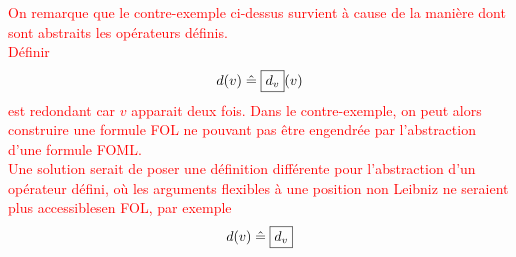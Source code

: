 \documentclass[12pt]{article}
\newcommand{\defeq}{\ensuremath{\; \hat{=} \;}}
\newcommand{\raph}[1]{\textcolor{red}{#1}}
\begin{document}
\vspace{1cm}

\raph{%
  On remarque que le contre-exemple ci-dessus survient à cause de la manière dont sont abstraits les
  opérateurs définis. \\
  Définir
  \[d(v) \defeq \framebox{$d_v$}(v)\]
  est redondant car $v$ apparait deux fois.
  Dans le contre-exemple, on peut alors construire une formule FOL ne pouvant pas être engendrée par l'abstraction d'une formule FOML. \\
  Une solution serait de poser une définition différente pour l'abstraction d'un opérateur défini, où les arguments flexibles à une position non Leibniz ne seraient plus \og{}accessibles\fg en FOL, par exemple
  \[d(v) \defeq \framebox{$d_v$}\]
}
\end{document}
